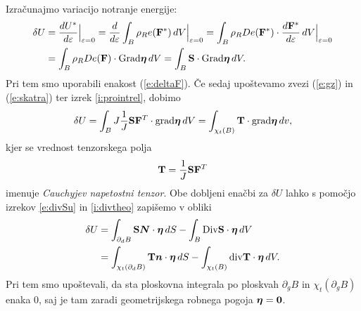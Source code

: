 Izračunajmo variacijo notranje energije:
\begin{align*} 
	\delta U &=\frac{dU^*}{d\varepsilon}\Big|_{\varepsilon=0}=\frac{d}{d\varepsilon}
	\int_{B}\rho_R e(\mathbf F^*)\,dV \Big|_{\varepsilon=0} =
	\int_{B}\rho_R De(\mathbf F^*)\cdot\frac{d\mathbf F^*}{d\varepsilon}\,dV \Big|_{\varepsilon=0} \\
	&= \int_{B}\rho_R De(\mathbf F)\cdot\mathrm{Grad}\boldsymbol \eta\,dV
	=\int_{B}\mathbf S\cdot\mathrm{Grad}\boldsymbol \eta\,dV.
\end{align*}
Pri tem smo uporabili enakost (\ref{e:deltaF}). Če sedaj upoštevamo zvezi (\ref{e:gz}) in
(\ref{e:skatra}) ter izrek \ref{i:prointrel}, dobimo
\begin{align*} 
	\delta U = \int_{B}J\frac{1}{J}\mathbf S\mathbf F^{T}\cdot\mathrm{grad}\boldsymbol \eta\,dV =
	\int_{\chi_t(B)}\mathbf T\cdot\mathrm{grad}\boldsymbol \eta\,dv,
\end{align*}
kjer se vrednost tenzorskega polja
\[
	\mathbf T=\frac{1}{J}\mathbf S\mathbf F^{T}
\]
imenuje \emph{Cauchyjev napetostni tenzor}. Obe dobljeni enačbi za $\delta U$ lahko
s pomočjo izrekov \ref{e:divSu} in \ref{i:divtheo} zapišemo v obliki
\begin{align}
	\delta U &= \int_{\partial_dB}\mathbf S\boldsymbol N\cdot\boldsymbol \eta\,dS-
	\int_B\mathrm {Div}\mathbf S\cdot\boldsymbol \eta\,dV \label{e:vapoesr} \\
	&= \int_{\chi_t(\partial_dB)}\mathbf T\boldsymbol n\cdot\boldsymbol \eta\,dS-
	\int_{\chi_t(B)}\mathrm{div}\mathbf T\cdot\boldsymbol \eta\,dV. \label{e:vapoesp}
\end{align}
Pri tem smo upoštevali, da sta ploskovna integrala po ploskvah $\partial_gB$ in
$\chi_t(\partial_gB)$ enaka 0, saj je tam zaradi geometrijskega robnega pogoja $\boldsymbol \eta=\boldsymbol 0$.

